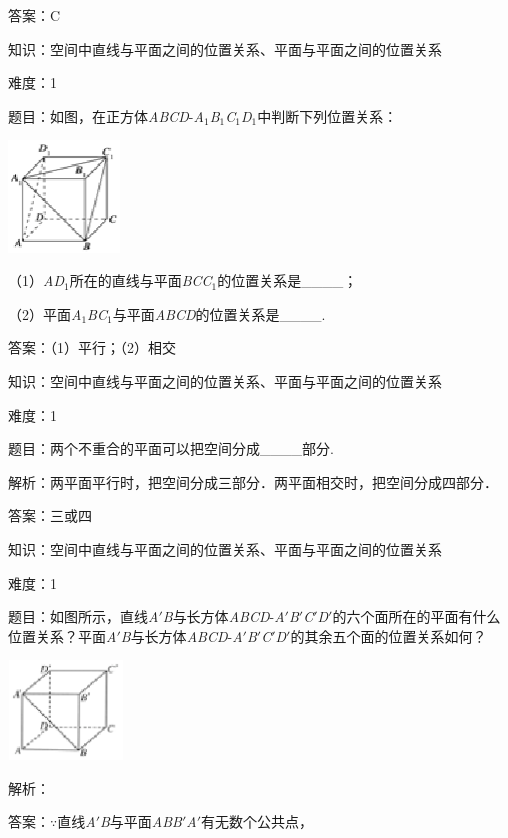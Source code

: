 \documentclass{article} %
\begin{document}
答案：C

知识：空间中直线与平面之间的位置关系、平面与平面之间的位置关系

难度：1

题目：如图，在正方体\textit{ABCD}-\textit{A}${}_{1}$\textit{B}${}_{1}$\textit{C}${}_{1}$\textit{D}${}_{1}$中判断下列位置关系：

\includegraphics*[width=1.17in, height=1.17in, keepaspectratio=false]{image121}

（1）\textit{AD}${}_{1}$所在的直线与平面\textit{BCC}${}_{1}$的位置关系是\_\_\_\_；

（2）平面\textit{A}${}_{1}$\textit{BC}${}_{1}$与平面\textit{ABCD}的位置关系是\_\_\_\_.

答案：（1）平行；（2）相交

知识：空间中直线与平面之间的位置关系、平面与平面之间的位置关系

难度：1

题目：两个不重合的平面可以把空间分成\_\_\_\_部分.

解析：两平面平行时，把空间分成三部分．两平面相交时，把空间分成四部分．

答案：三或四

知识：空间中直线与平面之间的位置关系、平面与平面之间的位置关系

难度：1

题目：如图所示，直线\textit{A}$'$\textit{B}与长方体\textit{ABCD}-\textit{A}$'$\textit{B}$'$\textit{C}$'$\textit{D}$'$的六个面所在的平面有什么位置关系？平面\textit{A}$'$\textit{B}与长方体\textit{ABCD}-\textit{A}$'$\textit{B}$'$\textit{C}$'$\textit{D}$'$的其余五个面的位置关系如何？



\includegraphics*[width=1.21in, height=1.04in, keepaspectratio=false]{image122}

解析：

答案：$\mathrm{\because}$直线\textit{A}$'$\textit{B}与平面\textit{ABB}$'$\textit{A}$'$有无数个公共点，
\end{document}
